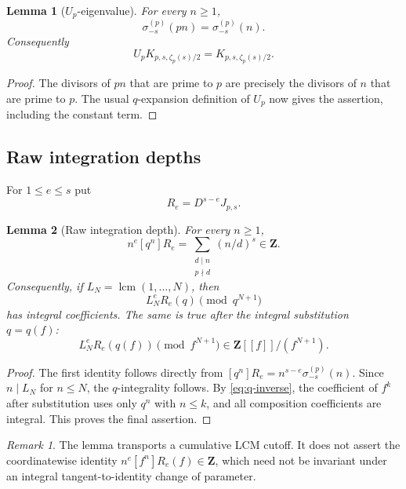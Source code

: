 \documentclass[11pt]{article}
\newtheorem{lemma}[lemma]{Lemma}
\theoremstyle{definition}
\theoremstyle{remark}
\newtheorem{remark}[remark]{Remark}
\newcommand{\Z}{\mathbf Z}
\newcommand{\lcmop}{\operatorname{lcm}}
\begin{document}
\begin{lemma}[$U_p$-eigenvalue]\label{lem:Up}
For every $n\ge1$,
\[
 \sigma_{-s}^{(p)}(pn)=\sigma_{-s}^{(p)}(n).
\]
Consequently
\[
 U_pK_{p,s,\zeta_p(s)/2}=K_{p,s,\zeta_p(s)/2}.
\]
\end{lemma}

\begin{proof}
The divisors of $pn$ that are prime to $p$ are precisely the divisors of $n$
that are prime to $p$.  The usual $q$-expansion definition of $U_p$ now gives
the assertion, including the constant term.
\end{proof}

\subsection{Raw integration depths}

For $1\le e\le s$ put
\begin{equation}\label{eq:R-def}
 R_e=D^{s-e}J_{p,s}.
\end{equation}

\begin{lemma}[Raw integration depth]\label{lem:raw-depth}
For every $n\ge1$,
\begin{equation}\label{eq:raw-depth}
 n^e[q^n]R_e
 =\sum_{\substack{d\mid n\\p\nmid d}}(n/d)^s\in\Z.
\end{equation}
Consequently, if $L_N=\lcmop(1,\ldots,N)$, then
\[
 L_N^eR_e(q)\pmod{q^{N+1}}
\]
has integral coefficients.  The same is true after the integral substitution
$q=q(f)$:
\[
 L_N^eR_e(q(f))\pmod{f^{N+1}}\in\Z[[f]]/(f^{N+1}).
\]
\end{lemma}

\begin{proof}
The first identity follows directly from
$[q^n]R_e=n^{s-e}\sigma_{-s}^{(p)}(n)$.  Since $n\mid L_N$ for
$n\le N$, the $q$-integrality follows.  By \eqref{eq:q-inverse}, the
coefficient of $f^k$ after substitution uses only $q^n$ with $n\le k$, and
all composition coefficients are integral.  This proves the final assertion.
\end{proof}

\begin{remark}
The lemma transports a cumulative LCM cutoff.  It does not assert the
coordinatewise identity $n^e[f^n]R_e(f)\in\Z$, which need not be invariant
under an integral tangent-to-identity change of parameter.
\end{remark}
\end{document}
